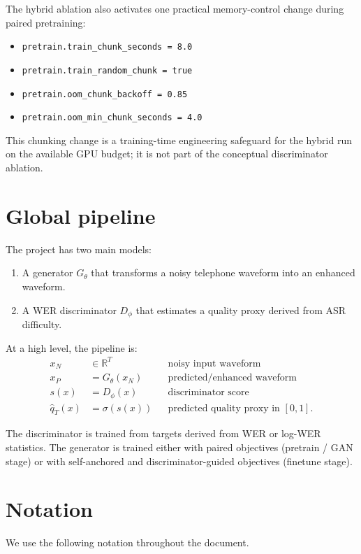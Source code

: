 \documentclass[11pt]{article}
\begin{document}
The hybrid ablation also activates one practical memory-control change during paired pretraining:
\begin{itemize}[leftmargin=*]
    \item \texttt{pretrain.train\_chunk\_seconds = 8.0}
    \item \texttt{pretrain.train\_random\_chunk = true}
    \item \texttt{pretrain.oom\_chunk\_backoff = 0.85}
    \item \texttt{pretrain.oom\_min\_chunk\_seconds = 4.0}
\end{itemize}
This chunking change is a training-time engineering safeguard for the hybrid run on the available GPU budget; it is not part of the conceptual discriminator ablation.

\section{Global pipeline}
The project has two main models:
\begin{enumerate}[leftmargin=*]
    \item A generator $G_{\theta}$ that transforms a noisy telephone waveform into an enhanced waveform.
    \item A WER discriminator $D_{\phi}$ that estimates a quality proxy derived from ASR difficulty.
\end{enumerate}

At a high level, the pipeline is:
\begin{align}
    x_N &\in \mathbb{R}^{T} && \text{noisy input waveform} \\
    x_P &= G_{\theta}(x_N) && \text{predicted/enhanced waveform} \\
    s(x) &= D_{\phi}(x) && \text{discriminator score} \\
    \hat{q}_T(x) &= \sigma(s(x)) && \text{predicted quality proxy in } [0,1].
\end{align}

The discriminator is trained from targets derived from WER or log-WER statistics. The generator is trained either with paired objectives (pretrain / GAN stage) or with self-anchored and discriminator-guided objectives (finetune stage).

\section{Notation}
We use the following notation throughout the document.
\end{document}
